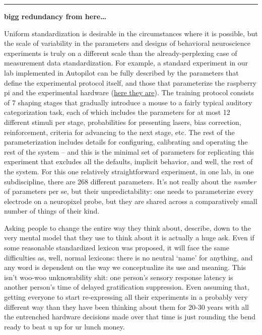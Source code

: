 \documentclass[10pt]{article}
\begin{document}
\begin{multicols}{2}
\begin{center}\rule{0.5\linewidth}{0.5pt}\end{center}

\textbf{bigg redundancy from here\ldots{}}

Uniform standardization is desirable in the circumstances where it is
possible, but the scale of variability in the parameters and designs of
behavioral neuroscience experiments is truly on a different scale than
the already-perplexing case of measurement data standardization. For
example, a standard experiment in our lab implemented in Autopilot can
be fully described by the parameters that define the experimental
protocol itself, and those that parameterize the raspberry pi and the
experimental hardware
(\href{https://gist.github.com/sneakers-the-rat/eebe675326a157df49f66f62c4e33a6e}{here
they are}). The training protocol consists of 7 shaping stages that
gradually introduce a mouse to a fairly typical auditory categorization
task, each of which includes the parameters for at most 12 different
stimuli per stage, probabilities for presenting lasers, bias correction,
reinforcement, criteria for advancing to the next stage, etc. The rest
of the parameterization includes details for configuring, calibrating
and operating the rest of the system -- and this is the minimal set of
parameters for replicating this experiment that excludes all the
defaults, implicit behavior, and well, the rest of the system. For this
one relatively straightforward experiment, in one lab, in one
subdiscipline, there are 268 different parameters. It's not really about
the \emph{number} of parameters per se, but their unpredictability: one
needs to parameterize every electrode on a neuropixel probe, but they
are shared across a comparatively small number of things of their kind.

Asking people to change the entire way they think about, describe, down
to the very mental model that they use to think about it is actually a
huge ask. Even if some reasonable standardized lexicon was proposed, it
will face the same difficulties as, well, normal lexicons: there is no
neutral `name' for anything, and any word is dependent on the way we
conceptualize its use and meaning. This isn't woo-woo unknowability
shit: one person's sensory response latency is another person's time of
delayed gratification suppression. Even assuming that, getting everyone
to start re-expressing all their experiments in a probably very
different way than they have been thinking about them for 20-30 years
with all the entrenched hardware decisions made over that time is just
rounding the bend ready to beat u up for ur lunch money.


\end{multicols}
\end{document}
